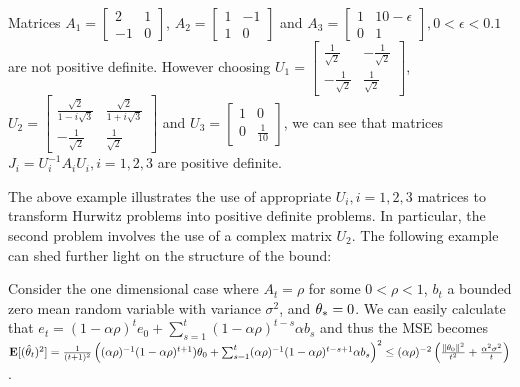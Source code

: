\begin{example}\label{ex:pdas}
Matrices $A_1=\begin{bmatrix} 2 &1 \\-1 &0\end{bmatrix}$,
$A_2=\begin{bmatrix}1 & -1\\ 1 &0 \end{bmatrix}$ and $A_3=\begin{bmatrix} 1 & 10-\epsilon \\ 0 &1 \end{bmatrix},0<\epsilon<0.1$ are not positive definite. However choosing $U_1=\begin{bmatrix} \frac{1}{\sqrt{2}}& -\frac{1}{\sqrt{2}}\\ -\frac{1}{\sqrt{2}} &\frac{1}{\sqrt{2}} \end{bmatrix}$, $U_2=\begin{bmatrix} \frac{\sqrt{2}}{1-i\sqrt{3}} & \frac{\sqrt{2}}{1+i\sqrt{3}} \\ -\frac{1}{\sqrt{2}} &\frac{1}{\sqrt{2}}\end{bmatrix}$ and $U_3=\begin{bmatrix} 1 & 0\\ 0 &\frac{1}{10} \end{bmatrix}$, we can see that matrices $J_i=U_i^{-1}A_i U_i,i=1,2,3$ are positive definite.
\end{example}
The above example  illustrates the use of appropriate $U_i,i=1,2,3$ matrices to transform Hurwitz problems into positive definite problems. In particular, the second problem involves the use of a complex matrix $U_2$.
\fi
{}
The following example can shed further light on the structure of the bound:%
\begin{example}\label{ex:geo}
Consider the one dimensional case where $A_t=\rho$ for some $0<\rho<1$, $b_t$ a bounded \iid zero mean random variable with variance $\sigma^2$, and $\theta_*=0$. We can easily calculate 
that $e_t=(1-\alpha\rho)^t e_0+\sum_{s=1}^t (1-\alpha \rho)^{t-s}\alpha b_s$ and thus the MSE becomes 
$%
\E[(\thh_t)^2]=\frac{1}{(t+1)^2}\left( (\alpha\rho)^{-1}(1-\alpha\rho)^{t+1}) \theta_0+ \sum_{s=1}^t (\alpha\rho)^{-1}(1-\alpha \rho)^{t-s+1} \alpha b_s\right)^2
\leq (\alpha\rho)^{-2}\left(\frac{\norm{\theta_0}^2}{t^2}+\frac{\alpha^2\sigma^2}{t}\right)
$.
\end{example}
